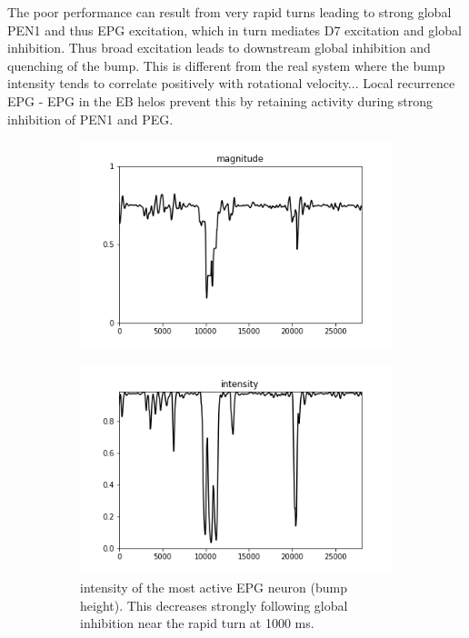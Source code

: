 \documentclass{article}
\begin{document}
The poor performance can result from very rapid turns leading to strong global PEN1 and thus EPG excitation, which in turn mediates D7 excitation and global inhibition. Thus broad excitation leads to downstream global inhibition and quenching of the bump. This is different from the real system where the bump intensity tends to correlate positively with rotational velocity...
Local recurrence EPG - EPG in the EB helos prevent this by retaining activity during strong inhibition of PEN1 and PEG.


\begin{figure}[h]
	\centering
	\begin{subfigure}[t]{0.73\linewidth}
		\centering
		\includegraphics[width = 1.0\linewidth, trim={0 0 0 0}, clip=true]{../figures/sim_mag.png}
		\label{fig:F}	
	\end{subfigure}
	\hspace{0.1\linewidth}
	\begin{subfigure}[t]{0.73\linewidth}
		\centering
		\includegraphics[width = 1.0\linewidth, trim={0 0 0 0}, clip=true]{../figures/sim_int.png}
		\caption{intensity of the most active EPG neuron (bump height). This decreases strongly following global inhibition near the rapid turn at 1000 ms.}
		\label{fig:dF}
	\end{subfigure}
\caption{}
\label{fig:fit}
\end{figure}
\end{document}
